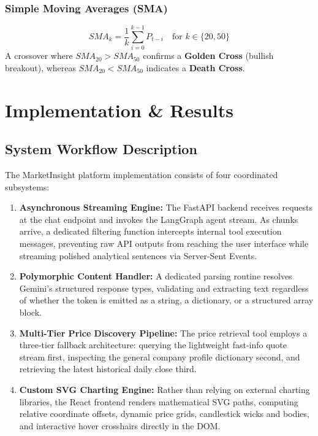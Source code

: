 \documentclass[12pt,a4paper]{report}
\begin{document}
\subsection{Simple Moving Averages (SMA)}
\begin{equation}
  SMA_k = \frac{1}{k} \sum_{i=0}^{k-1} P_{t-i} \quad \text{for } k \in \{20, 50\}
\end{equation}
A crossover where $SMA_{20} > SMA_{50}$ confirms a \textbf{Golden Cross} (bullish breakout), whereas $SMA_{20} < SMA_{50}$ indicates a \textbf{Death Cross}.

\clearpage
\chapter{Implementation \& Results}

\section{System Workflow Description}

The MarketInsight platform implementation consists of four coordinated subsystems:
\begin{enumerate}[leftmargin=*,label=\textbf{\arabic*.}]
  \item \textbf{Asynchronous Streaming Engine:} The FastAPI backend receives requests at the chat endpoint and invokes the LangGraph agent stream. As chunks arrive, a dedicated filtering function intercepts internal tool execution messages, preventing raw API outputs from reaching the user interface while streaming polished analytical sentences via Server-Sent Events.
  \item \textbf{Polymorphic Content Handler:} A dedicated parsing routine resolves Gemini's structured response types, validating and extracting text regardless of whether the token is emitted as a string, a dictionary, or a structured array block.
  \item \textbf{Multi-Tier Price Discovery Pipeline:} The price retrieval tool employs a three-tier fallback architecture: querying the lightweight fast-info quote stream first, inspecting the general company profile dictionary second, and retrieving the latest historical daily close third.
  \item \textbf{Custom SVG Charting Engine:} Rather than relying on external charting libraries, the React frontend renders mathematical SVG paths, computing relative coordinate offsets, dynamic price grids, candlestick wicks and bodies, and interactive hover crosshairs directly in the DOM.
\end{enumerate}
\end{document}

